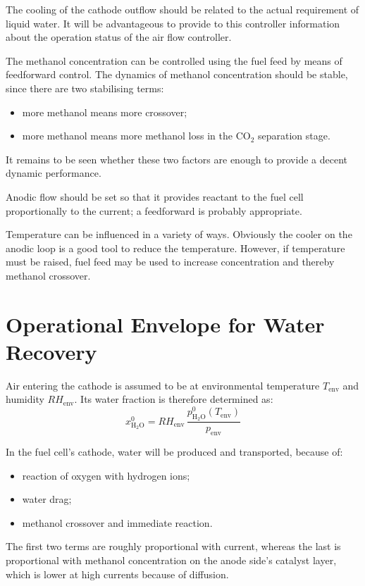 \documentclass[a4paper,10pt]{article}
\newcommand{\HHO}{\ensuremath{\mathrm{H_2O}}}
\newcommand{\COO}{\ensuremath{\mathrm{CO_2}}}
\begin{document}
The cooling of the cathode outflow should be related to the actual requirement
of liquid water. It will be advantageous to provide to this controller
information about the operation status of the air flow controller.

The methanol concentration can be controlled using the fuel feed by means of
feedforward control. The dynamics of methanol concentration should be stable,
since there are two stabilising terms:
\begin{itemize}
\item more methanol means more crossover;
\item more methanol means more methanol loss in the \COO{} separation stage.
\end{itemize}
It remains to be seen whether these two factors are enough to provide a decent
dynamic performance.

Anodic flow should be set so that it provides reactant to the fuel cell
proportionally to the current; a feedforward is probably appropriate.

Temperature can be influenced in a variety of ways. Obviously the cooler on the
anodic loop is a good tool to reduce the temperature. However, if temperature
must be raised, fuel feed may be used to increase concentration and thereby
methanol crossover.



\pagebreak
\section{Operational Envelope for Water Recovery}
Air entering the cathode is assumed to be at environmental temperature
$T_\text{env}$ and humidity $RH_\text{env}$. Its water fraction is therefore
determined as:
\begin{equation}
x_\HHO^0 = RH_\text{env}\,\frac{p_\HHO^0(T_\text{env})}{p_\text{env}}
\end{equation}

In the fuel cell's cathode, water will be produced and transported, because of:
\begin{itemize}
\item reaction of oxygen with hydrogen ions;
\item water drag;
\item methanol crossover and immediate reaction.
\end{itemize}

The first two terms are roughly proportional with current, whereas the last is
proportional with methanol concentration on the anode side's catalyst layer,
which is lower at high currents because of diffusion.
\end{document}
